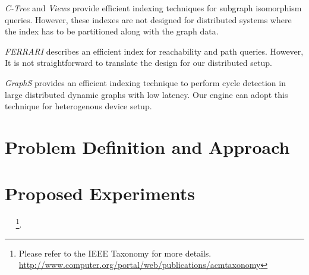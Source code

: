 \documentclass[conference]{IEEEtran}
\begin{document}
\emph{C-Tree} and \emph{Views} provide efficient indexing techniques for subgraph isomorphism queries. However, these indexes are not designed for distributed systems where the index has to be partitioned along with the graph data.

\emph{FERRARI} describes an efficient index for reachability and path queries. However, It is not straightforward to translate the design for our distributed setup.

\emph{GraphS} provides an efficient indexing technique to perform cycle detection in large distributed dynamic graphs with low latency. Our engine can adopt this technique for heterogenous device setup.  

\section{Problem Definition and Approach}

\section{Proposed Experiments}

~\cite{simmhan:cise:2013} ~\footnote{Please refer to the IEEE Taxonomy for more details. \url{http://www.computer.org/portal/web/publications/acmtaxonomy}}.






\end{document}
